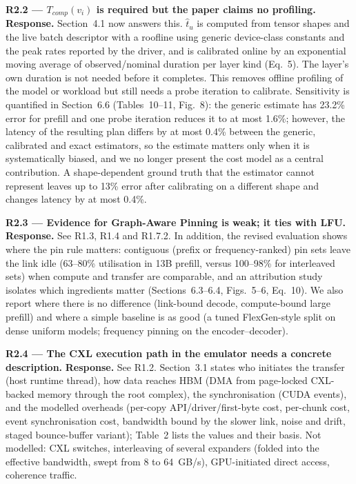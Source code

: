 \documentclass[11pt]{article}
\newcommand{\rc}[1]{\par\medskip\noindent\textbf{#1}}
\begin{document}
\rc{R2.2 --- $T_{comp}(v_i)$ is required but the paper claims no profiling.}
\textbf{Response.} Section~4.1 now answers this. $\hat t_u$ is computed from tensor shapes and the live batch descriptor with a roofline using generic device-class constants and the peak rates reported by the driver, and is calibrated online by an exponential moving average of observed/nominal duration per layer kind (Eq.~5). The layer's own duration is not needed before it completes. This removes offline profiling of the model or workload but still needs a probe iteration to calibrate. Sensitivity is quantified in Section~6.6 (Tables~10--11, Fig.~8): the generic estimate has 23.2\% error for prefill and one probe iteration reduces it to at most 1.6\%; however, the latency of the resulting plan differs by at most 0.4\% between the generic, calibrated and exact estimators, so the estimate matters only when it is systematically biased, and we no longer present the cost model as a central contribution. A shape-dependent ground truth that the estimator cannot represent leaves up to 13\% error after calibrating on a different shape and changes latency by at most 0.4\%.

\rc{R2.3 --- Evidence for Graph-Aware Pinning is weak; it ties with LFU.}
\textbf{Response.} See R1.3, R1.4 and R1.7.2. In addition, the revised evaluation shows where the pin rule matters: contiguous (prefix or frequency-ranked) pin sets leave the link idle (63--80\% utilisation in 13B prefill, versus 100--98\% for interleaved sets) when compute and transfer are comparable, and an attribution study isolates which ingredients matter (Sections~6.3--6.4, Figs.~5--6, Eq.~10). We also report where there is no difference (link-bound decode, compute-bound large prefill) and where a simple baseline is as good (a tuned FlexGen-style split on dense uniform models; frequency pinning on the encoder--decoder).

\rc{R2.4 --- The CXL execution path in the emulator needs a concrete description.}
\textbf{Response.} See R1.2. Section~3.1 states who initiates the transfer (host runtime thread), how data reaches HBM (DMA from page-locked CXL-backed memory through the root complex), the synchronisation (CUDA events), and the modelled overheads (per-copy API/driver/first-byte cost, per-chunk cost, event synchronisation cost, bandwidth bound by the slower link, noise and drift, staged bounce-buffer variant); Table~2 lists the values and their basis. Not modelled: CXL switches, interleaving of several expanders (folded into the effective bandwidth, swept from 8 to 64~GB/s), GPU-initiated direct access, coherence traffic.
\end{document}
